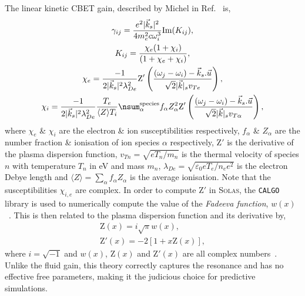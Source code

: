 The linear kinetic \ac{CBET} gain, described by Michel in Ref.~\cite{michel_saturation_2013} is,
\begin{equation}
    \label{eq:SOLAS_CBET_kinetc_gain}
    \begin{gathered}
        \gamma_{ij} = \frac{e^2 |\vec{k}_s|^2}{4 m_e^2 c \omega_i^3}\text{Im}(K_{ij}), \\
        K_{ij} = \frac{\chi_e(1+\chi_i)}{(1+\chi_e+\chi_i)}, \\
        \chi_e = \frac{-1}{2 |\vec{k}_s|^2 \lambda_{De}^2} \text{Z}'\left( \frac{(\omega_j-\omega_i)-\vec{k}_s.\vec{u}}{\sqrt{2} |\vec{k}|_s v_{Te}} \right), \\
        \chi_i = \frac{-1}{2 |\vec{k}_s|^2 \lambda_{De}^2} \frac{T_e}{\langle Z\rangle T_i} \nsum_{\alpha}^{\text{species}} f_{\alpha}Z_{\alpha}^2  \text{Z}'\left( \frac{(\omega_j-\omega_i)-\vec{k}_s.\vec{u}}{\sqrt{2} |\vec{k}|_s v_{T\alpha}} \right), \\
    \end{gathered}
\end{equation}
where $\chi_e$ \& $\chi_i$ are the electron \& ion susceptibilities respectively, $f_{\alpha}$ \& $Z_{\alpha}$ are the number fraction \& ionisation of ion species $\alpha$ respectively, $\text{Z}'$ is the derivative of the plasma dispersion function, $v_{Tn}=\sqrt{e T_n/m_n}$ is the thermal velocity of species $n$ with temperature $T_n$ in eV and mass $m_n$, $\lambda_{De}=\sqrt{\varepsilon_0 e T_e / n_e e^2}$ is the electron Debye length and $\langle Z \rangle = \sum_{\alpha}f_{\alpha}Z_{\alpha}$ is the average ionisation.
Note that the susceptibilities $\chi_{i,e}$ are complex.
In order to compute $\text{Z}'$ in \textsc{Solas}, the \texttt{CALGO} library is used to numerically compute the value of the \textit{Fadeeva function}, $w(x)$~\cite{poppe_algorithm_1990}.
This is then related to the plasma dispersion function and its derivative by,
\begin{equation}
    \label{eq:SOLAS_plasma_disp_func}
    \begin{gathered}
        \text{Z}(x) = i\sqrt{\pi} w(x), \\
        \text{Z}'(x) = -2 [1 + x \text{Z}(x)],
    \end{gathered}
\end{equation}
where $i=\sqrt{-1}$ and $w(x)$, $\text{Z}(x)$ and $\text{Z}'(x)$ are all complex numbers~\cite{fried_plasma_1961}.
Unlike the fluid gain, this theory correctly captures the resonance and has no effective free parameters, making it the judicious choice for predictive simulations.
